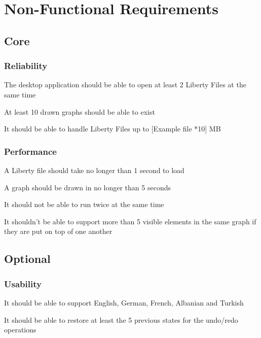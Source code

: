 \documentclass[10pt,a4paper]{report}
\begin{document}
\section{Non-Functional Requirements}
\subsection{Core}
\subsubsection{Reliability}
\begin{NFR-Rel}
    \item The desktop application should be able to open at least 2 Liberty Files at the same time
    \item At least 10 drawn graphs should be able to exist
    \item It should be able to handle Liberty Files up to [Example file *10] MB
\end{NFR-Rel}

\subsubsection{Performance}
\begin{NFR-Perf}
    \item A Liberty file should take no longer than 1 second to load
    \item A graph should be drawn in no longer than 5 seconds
    \item It should not be able to run twice at the same time
    \item It shouldn’t be able to support more than 5 visible elements in the same graph if they are put on top of one another
\end{NFR-Perf}

\subsection{Optional}
\subsubsection{Usability}
\begin{NFRO-Usability}
    \item It should be able to support English, German, French, Albanian and Turkish
    \item It should be able to restore at least the 5 previous states for the undo/redo operations 
\end{NFRO-Usability}
\end{document}
